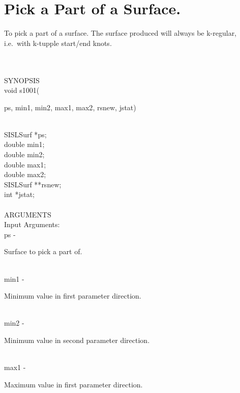 \section{Pick a Part of a Surface.}
\begin{minipg1}
  To pick a part of a surface.
  The surface produced will always be k-regular, i.e.\ with
  k-tupple start/end knots.
\end{minipg1} \\ \\
SYNOPSIS\\
        \>void s1001(\begin{minipg3}
          {\fov ps},  {\fov min1},  {\fov min2},  {\fov max1},  {\fov max2},  {\fov rsnew},  {\fov jstat})
        \end{minipg3}\\[0.3ex]
        \>\>    SISLSurf \> *{\fov ps};\\
        \>\>    double   \> {\fov min1};\\
        \>\>    double   \> {\fov min2};\\
        \>\>    double   \> {\fov max1};\\
        \>\>    double   \> {\fov max2};\\
        \>\>    SISLSurf \> **{\fov rsnew};\\
        \>\>    int      \> *{\fov jstat};\\
\\
ARGUMENTS\\
        \>Input Arguments:\\
        \>\>    {\fov ps}\> - \>  \begin{minipg2}
                     Surface to pick a part of.
                               \end{minipg2}\\
        \>\>    {\fov min1}\> - \>  \begin{minipg2}
                     Minimum value in first parameter direction.
                               \end{minipg2}\\
        \>\>    {\fov min2}\> - \>  \begin{minipg2}
                     Minimum value in second parameter direction.
                               \end{minipg2}\\
        \>\>    {\fov max1}\> - \>  \begin{minipg2}
                     Maximum value in first parameter direction.
                               \end{minipg2}\\
